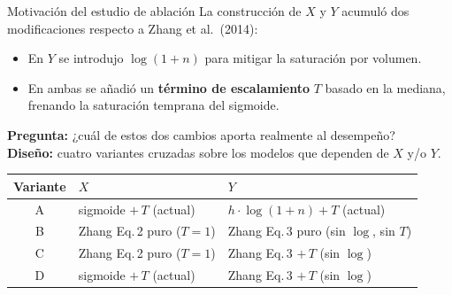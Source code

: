 \documentclass[aspectratio=169,11pt]{beamer}
\begin{document}
\begin{frame}{Motivaci\'on del estudio de ablaci\'on}
	\small
	La construcci\'on de $X$ y $Y$ acumul\'o dos modificaciones respecto a Zhang et al.\ (2014):
	\begin{itemize}
		\item En $Y$ se introdujo $\log(1+n)$ para mitigar la saturaci\'on por volumen.
		\item En ambas se a\~nadi\'o un \textbf{t\'ermino de escalamiento} $T$ basado en la mediana, frenando la saturaci\'on temprana del sigmoide.
	\end{itemize}
	\vspace{0.4em}
	\textbf{Pregunta:} ¿cu\'al de estos dos cambios aporta realmente al desempe\~no?\\[0.3em]
	\textbf{Dise\~no:} cuatro variantes cruzadas sobre los modelos que dependen de $X$ y/o $Y$.

	\vspace{0.8em}
	\centering
	\renewcommand{\arraystretch}{1.15}
	\begin{tabular}{c l l}
		\toprule
		\textbf{Variante} & \textbf{$X$}              & \textbf{$Y$}                            \\
		\midrule
		A                 & sigmoide $+\,T$ (actual)  & $h\cdot\log(1+n)+T$ (actual)            \\
		B                 & Zhang Eq.\,2 puro ($T=1$) & Zhang Eq.\,3 puro (sin $\log$, sin $T$) \\
		C                 & Zhang Eq.\,2 puro ($T=1$) & Zhang Eq.\,3 $+\,T$ (sin $\log$)        \\
		D                 & sigmoide $+\,T$ (actual)  & Zhang Eq.\,3 $+\,T$ (sin $\log$)        \\
		\bottomrule
	\end{tabular}
\end{frame}
\end{document}
